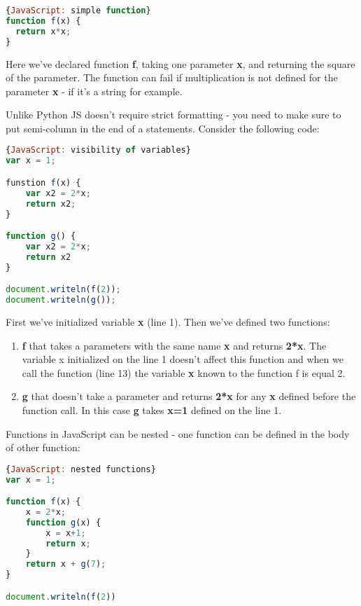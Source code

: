 \begin{lstlisting}[style=codelst,language=JavaScript]{JavaScript: simple function}
function f(x) {
  return x*x;
}
\end{lstlisting}

Here we've declared function \textbf{f}, taking one parameter \textbf{x},
and returning the square of the parameter. The function
can fail if multiplication is not defined for the parameter \textbf{x} -
if it's a string for example.

Unlike Python JS doesn't require strict formatting - you need to
make sure to put semi-column in the end of a statements. Consider the
following code:

\begin{lstlisting}[style=codelst,language=JavaScript]{JavaScript: visibility of variables}
var x = 1;

funstion f(x) {
    var x2 = 2*x;
    return x2;
}

function g() {
    var x2 = 2*x;
    return x2
}

document.writeln(f(2));
document.writeln(g());
\end{lstlisting}
First we've initialized variable \textbf{x} (line 1). Then we've
defined two functions:

\begin{enumerate}
\item \textbf{f} that takes a parameters with the same
name \textbf{x} and returns \textbf{2*x}. The variable x initialized on
the line 1 doesn't affect this function and when we call
the function (line 13) the variable \textbf{x} known to
the function f is equal 2.
\item \textbf{g} that doesn't take a parameter and returns \textbf{2*x} for
any \textbf{x} defined before the function call. In this case \textbf{g}
takes \textbf{x=1} defined on the line 1.
\end{enumerate}

Functions in JavaScript can be nested - one function can be defined in
the body of other function:

\begin{lstlisting}[style=codelst,language=JavaScript]{JavaScript: nested functions}
var x = 1;

function f(x) {
    x = 2*x;
    function g(x) {
        x = x+1;
        return x;
    }
    return x + g(7);
}

document.writeln(f(2))
\end{lstlisting}

